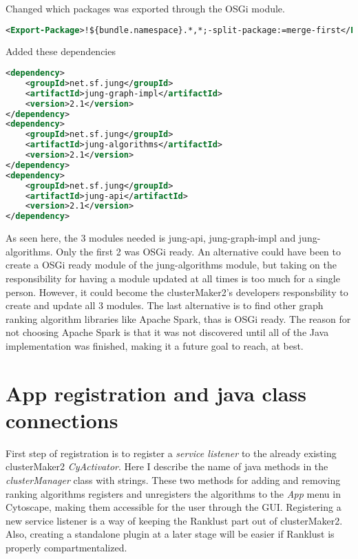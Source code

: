 Changed which packages was exported through the OSGi module.

\begin{lstlisting}[language=XML, caption={POM-file OSGi changes}]
<Export-Package>!${bundle.namespace}.*,*;-split-package:=merge-first</Export-Package>
\end{lstlisting}

Added these dependencies

\begin{lstlisting}[language=XML, caption={POM-file JUNG changes}]
<dependency>
    <groupId>net.sf.jung</groupId>
    <artifactId>jung-graph-impl</artifactId>
    <version>2.1</version>
</dependency>
<dependency>
    <groupId>net.sf.jung</groupId>
    <artifactId>jung-algorithms</artifactId>
    <version>2.1</version>
</dependency>
<dependency>
    <groupId>net.sf.jung</groupId>
    <artifactId>jung-api</artifactId>
    <version>2.1</version>
</dependency>
\end{lstlisting}

As seen here, the 3 modules needed is jung-api, jung-graph-impl and
jung-algorithms. Only the first 2 was OSGi ready. An alternative could have been
to create a OSGi ready module of the jung-algorithms module, but taking on the
responsibility for having a module updated at all times is too much for a single
person. However, it could become the clusterMaker2's developers responsbility to
create and update all 3 modules. The last alternative is to find other graph
ranking algorithm libraries like Apache Spark\cite{spark}, thas is OSGi ready.
The reason for not choosing Apache Spark is that it was not discovered until all
of the Java implementation was finished, making it a future goal to reach, at
best.

\section{App registration and java class connections}
First step of registration is to register a \textit{service listener} to the
already existing clusterMaker2 \textit{CyActivator}. Here I describe the name
of java methods in the \textit{clusterManager} class with strings. These two
methods for adding and removing ranking algorithms registers and unregisters the
algorithms to the \textit{App} menu in Cytoscape, making them accessible for the
user through the GUI. Registering a new service listener is a way of keeping the
Ranklust part out of clusterMaker2. Also, creating a standalone plugin at
a later stage will be easier if Ranklust is properly compartmentalized.

